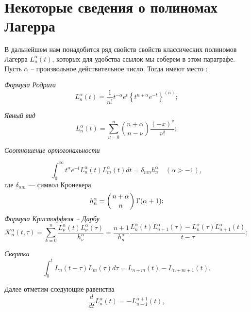 \section{Некоторые сведения о полиномах Лагерра}
В дальнейшем нам понадобится ряд свойств свойств классических полиномов Лагерра $L_n^{\alpha}(t)$, которых для удобства ссылок мы соберем в этом параграфе. Пусть $\alpha$ -- произвольное действительное число. Тогда  имеют место \cite{Sege}:

\textit{Формула Родрига}
\begin{equation}\label{2.1}
L_n^{\alpha}(t) = \frac{1}{n!}t^{-\alpha}e^{t} \left\{ t^{n+\alpha} e^{-t} \right\}^{(n)};
\end{equation}

\textit{Явный вид}
\begin{equation}\label{2.2}
L_n^\alpha(t) =
\sum\limits_{\nu=0}^{n}
\binom{n+\alpha}{n-\nu}
\frac{(-x)^\nu}{\nu!};
\end{equation}

\textit{Соотношение ортогональности}

\begin{equation}
\label{2.3}
\int_0^{\infty} t^{\alpha} e^{-t} L^{\alpha}_{n}(t) L^{\alpha}_{m}(t) dt = \delta_{nm} h^{\alpha}_n \quad (\alpha > -1),
\end{equation}
где $\delta_{nm}$ --- символ Кронекера,
\begin{equation}\label{2.4}
h^{\alpha}_n = \left( n+\alpha \atop n \right) \Gamma(\alpha +1);
\end{equation}
\textit{Формула Кристоффеля -- Дарбу}
\begin{equation}\label{2.5}
\mathcal{K}_n^\alpha(t,\tau)=
\sum\limits_{k=0}^{n}\frac{L_\nu^\alpha(t)L_\nu^\alpha(\tau)}{h_\nu^\alpha}=
\frac{n+1}{h_n^\alpha}
\frac{L_n^\alpha(t)L_{n+1}^\alpha(\tau) - L_n^\alpha(\tau)L_{n+1}^\alpha(t)}{t-\tau};
\end{equation}

\textit{Свертка}
\begin{equation}
\label{2.6}
\int_0^{t} L_{n}(t-\tau) L_{m}(\tau) d\tau = L_{n+m}(t) - L_{n+m+1}(t).
\end{equation}

Далее отметим следующие равенства
\begin{equation}\label{2.7}
\frac{d}{dt} L_n^{\alpha}(t) = -L_{n-1}^{\alpha+1}(t),
\end{equation}

